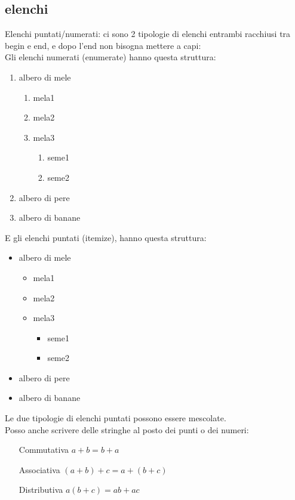 \documentclass[11pt]{article}
\begin{document}
\subsection{elenchi}
Elenchi puntati/numerati: ci sono 2 tipologie di elenchi entrambi racchiusi tra begin e end, e dopo l'end non 
bisogna mettere a capi:\\
Gli elenchi numerati (enumerate) hanno questa struttura:\\
\begin{enumerate}
\item albero di mele
    \begin{enumerate}
        \item mela1
        \item mela2
        \item mela3
        \begin{enumerate}
            \item seme1
            \item seme2
        \end{enumerate}
    \end{enumerate}
\item albero di pere
\item albero di banane
\end{enumerate}
E gli elenchi puntati (itemize), hanno questa struttura:\\
\begin{itemize}
    \item albero di mele
        \begin{itemize}
            \item mela1
            \item mela2
            \item mela3
            \begin{itemize}
                \item seme1
                \item seme2
            \end{itemize}
        \end{itemize}
    \item albero di pere
    \item albero di banane
\end{itemize}
Le due tipologie di elenchi puntati possono essere mescolate.\\
Posso anche scrivere delle stringhe al posto dei punti o dei numeri:\\
\begin{enumerate}
\item[Commutativa] $a+b=b+a$
\item[Associativa] $(a+b)+c=a+(b+c)$
\item[Distributiva] $a(b+c)=ab+ac$
\end{enumerate}
\end{document}
